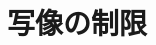 \documentclass[../../../topic_linear-algebra]{subfiles}
\begin{document}
\sectionline
\section{写像の制限}

\todo{}
\end{document}
